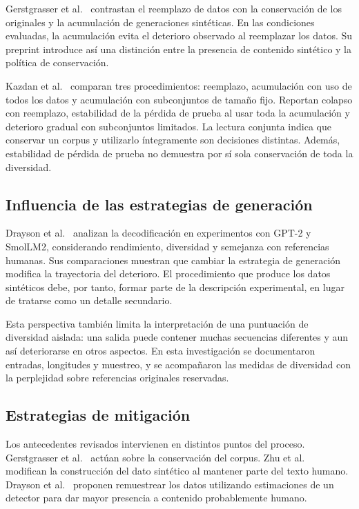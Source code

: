 \documentclass[12pt,letterpaper]{article}
\begin{document}
Gerstgrasser et al.\ \cite{gerstgrasser2024} contrastan el reemplazo de datos
con la conservación de los originales y la acumulación de generaciones
sintéticas. En las condiciones evaluadas, la acumulación evita el deterioro
observado al reemplazar los datos. Su preprint introduce así una distinción
entre la presencia de contenido sintético y la política de conservación.

Kazdan et al.\ \cite{kazdan2025} comparan tres procedimientos: reemplazo,
acumulación con uso de todos los datos y acumulación con subconjuntos de
tamaño fijo. Reportan colapso con reemplazo, estabilidad de la pérdida de
prueba al usar toda la acumulación y deterioro gradual con subconjuntos
limitados. La lectura conjunta indica que conservar un corpus y utilizarlo
íntegramente son decisiones distintas. Además, estabilidad de pérdida de
prueba no demuestra por sí sola conservación de toda la diversidad.

\subsection{Influencia de las estrategias de generación}

Drayson et al.\ \cite{drayson2025} analizan la decodificación en experimentos
con GPT-2 y SmolLM2, considerando rendimiento, diversidad y semejanza con
referencias humanas. Sus comparaciones muestran que cambiar la estrategia
de generación modifica la trayectoria del deterioro. El procedimiento
que produce los datos sintéticos debe, por tanto, formar parte de la
descripción experimental, en lugar de tratarse como un detalle secundario.

Esta perspectiva también limita la interpretación de una puntuación de
diversidad aislada: una salida puede contener muchas secuencias diferentes
y aun así deteriorarse en otros aspectos. En esta investigación se
documentaron entradas, longitudes y muestreo, y se acompañaron las medidas
de diversidad con la perplejidad sobre referencias originales reservadas.

\subsection{Estrategias de mitigación}

Los antecedentes revisados intervienen en distintos puntos del proceso.
Gerstgrasser et al.\ \cite{gerstgrasser2024} actúan sobre la conservación
del corpus. Zhu et al.\ \cite{zhu2025} modifican la construcción del dato
sintético al mantener parte del texto humano. Drayson et al.\
\cite{drayson2025} proponen remuestrear los datos utilizando estimaciones
de un detector para dar mayor presencia a contenido probablemente humano.
\end{document}
